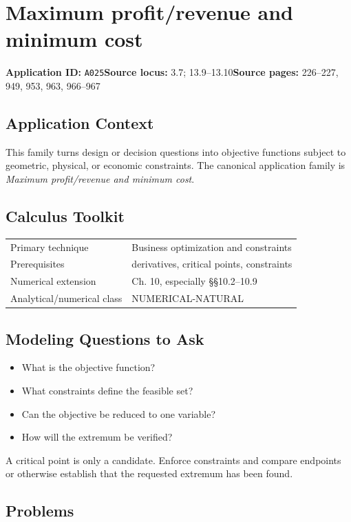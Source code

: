 \documentclass[11pt]{book}
\newcommand{\pid}[1]{\texttt{#1}}
\begin{document}
\chapter{Maximum profit/revenue and minimum cost}\label{app:A025}
\textbf{Application ID:} \pid{A025}\quad \textbf{Source locus:} 3.7; 13.9–13.10\quad \textbf{Source pages:} 226–227, 949, 953, 963, 966–967
\section*{Application Context}
This family turns design or decision questions into objective functions subject to geometric, physical, or economic constraints. The canonical application family is \emph{Maximum profit/revenue and minimum cost}.
\section*{Calculus Toolkit}
\begin{tabularx}{\textwidth}{@{}lX@{}}\toprule
Primary technique & Business optimization and constraints \\
Prerequisites & derivatives, critical points, constraints \\
Numerical extension & Ch. 10, especially §§10.2–10.9 \\
Analytical/numerical class & NUMERICAL-NATURAL \\
\bottomrule\end{tabularx}
\section*{Modeling Questions to Ask}\begin{itemize}
\item What is the objective function?
\item What constraints define the feasible set?
\item Can the objective be reduced to one variable?
\item How will the extremum be verified?
\end{itemize}
\begin{errorbox}A critical point is only a candidate. Enforce constraints and compare endpoints or otherwise establish that the requested extremum has been found.\end{errorbox}
\section*{Problems}
\end{document}
